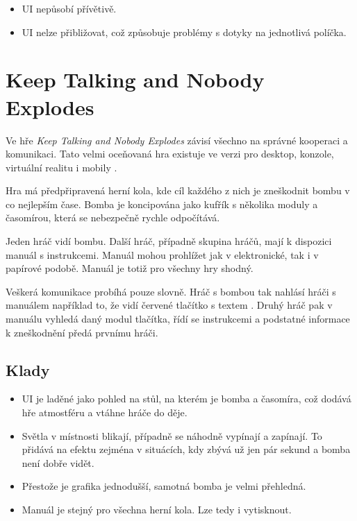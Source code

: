 \begin{itemize}
    \item UI nepůsobí přívětivě.
    \item UI nelze přibližovat,
což způsobuje problémy s dotyky na jednotlivá políčka.
\end{itemize}

\section{Keep Talking and Nobody Explodes}

Ve hře \emph{Keep Talking and Nobody Explodes} závisí všechno na správné
kooperaci a komunikaci.
Tato velmi oceňovaná hra existuje ve verzi pro desktop, konzole,
virtuální realitu i mobily \cite{steelcrategamesinc_keep}.

Hra má předpřipravená herní kola,
kde cíl každého z nich je zneškodnit bombu v co nejlepším čase.
Bomba je koncipována jako kufřík s několika moduly a časomírou,
která se nebezpečně rychle odpočítává.

Jeden hráč vidí bombu.
Další hráč, případně skupina hráčů, mají k dispozici manuál s instrukcemi.
Manuál mohou prohlížet jak v elektronické, tak i v papírové podobě.
Manuál je totiž pro všechny hry shodný.

Veškerá komunikace probíhá pouze slovně.
Hráč s bombou tak nahlásí hráči s manuálem například to,
že vidí červené tlačítko s textem .
Druhý hráč pak v manuálu vyhledá daný modul tlačítka, řídí se instrukcemi a
podstatné informace k zneškodnění předá prvnímu hráči.

\FloatBarrier

\subsection*{Klady}

\begin{itemize}
    \item UI je laděné jako pohled na stůl, na kterém je bomba a časomíra,
což dodává hře atmostféru a vtáhne hráče do děje.
    \item Světla v místnosti blikají, případně se náhodně vypínají a zapínají.
To přidává na efektu zejména v situácích,
kdy zbývá už jen pár sekund a bomba není dobře vidět.
    \item Přestože je grafika jednodušší, samotná bomba je velmi přehledná.
    \item Manuál je stejný pro všechna herní kola. Lze tedy i vytisknout.
\end{itemize}

